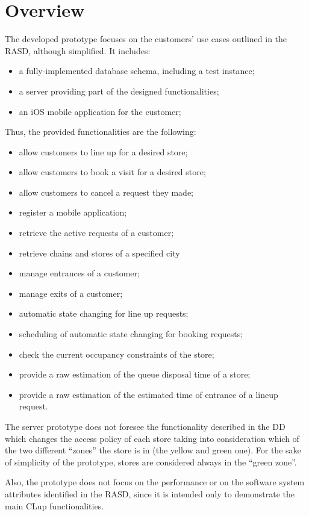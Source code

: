\documentclass[a4paper,oneside,11pt]{book}
\begin{document}
    \section{Overview}
    The developed prototype focuses on the customers' use cases outlined in the RASD, although simplified. It includes:
    \begin{itemize}
        \item a fully-implemented database schema, including a test instance;
        \item a server providing part of the designed functionalities;
        \item an iOS mobile application for the customer;
    \end{itemize}
    Thus, the provided functionalities are the following:
    \begin{itemize}
        \item allow customers to line up for a desired store;
        \item allow customers to book a visit for a desired store;
        \item allow customers to cancel a request they made;
        \item register a mobile application;
        \item retrieve the active requests of a customer;
        \item retrieve chains and stores of a specified city
        \item manage entrances of a customer;
        \item manage exits of a customer;
        \item automatic state changing for line up requests;
        \item scheduling of automatic state changing for booking requests;
        \item check the current occupancy constraints of the store;
        \item provide a raw estimation of the queue disposal time of a store;
        \item provide a raw estimation of the estimated time of entrance of a lineup request.
    \end{itemize}
    The server prototype does not foresee the functionality described in the DD which changes the access policy of each store taking into consideration which of the two different “zones” the store is in (the yellow and green one). For the sake of simplicity of the prototype, stores are considered always in the “green zone”.  \par
    Also, the prototype does not focus on the performance or on the  software system attributes identified in the RASD, since it is intended only to demonstrate the main CLup functionalities.
\end{document}
